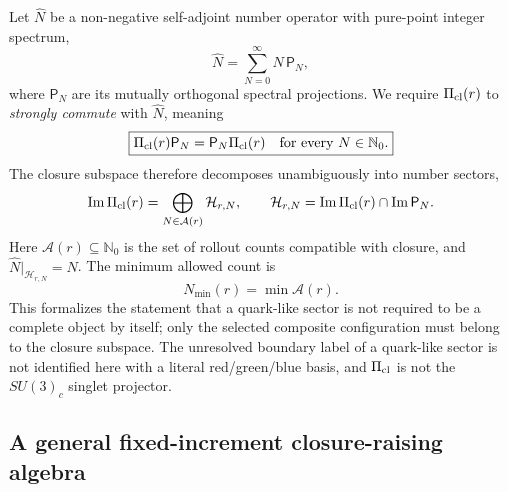 \documentclass[10pt]{article}
\begin{document}
Let $\hat N$ be a non-negative self-adjoint number operator with pure-point integer spectrum,
\begin{equation}
\boxed{
\hat N=\sum_{N=0}^{\infty}N\,\mathsf P_N,
}
\label{eq:numberSpectral}
\end{equation}
where $\mathsf P_N$ are its mutually orthogonal spectral projections. We require $\Pi_{\rm cl}(r)$ to \emph{strongly commute} with $\hat N$, meaning
\begin{equation}
\boxed{
\Pi_{\rm cl}(r)\mathsf P_N
=\mathsf P_N\Pi_{\rm cl}(r)
\quad\text{for every }N\in\mathbb N_0.
}
\label{eq:strongCommute}
\end{equation}
The closure subspace therefore decomposes unambiguously into number sectors,
\begin{equation}
\operatorname{Im}\Pi_{\rm cl}(r)
=\bigoplus_{N\in\mathcal A(r)}\mathcal H_{r,N},
\qquad
\mathcal H_{r,N}
=\operatorname{Im}\Pi_{\rm cl}(r)\cap\operatorname{Im}\mathsf P_N.
\label{eq:Nsectors}
\end{equation}
Here $\mathcal A(r)\subseteq\mathbb N_0$ is the set of rollout counts compatible with closure, and $\hat N|_{\mathcal H_{r,N}}=N$. The minimum allowed count is
\begin{equation}
\boxed{
N_{\min}(r)=\min\mathcal A(r).
}
\label{eq:NminDef}
\end{equation}
This formalizes the statement that a quark-like sector is not required to be a complete object by itself; only the selected composite configuration must belong to the closure subspace. The unresolved boundary label of a quark-like sector is not identified here with a literal red/green/blue basis, and $\Pi_{\rm cl}$ is not the $SU(3)_c$ singlet projector.

\subsection{A general fixed-increment closure-raising algebra}
\end{document}
